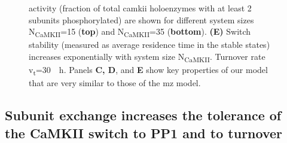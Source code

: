 \documentclass[9pt,lineno,doublespacing]{elife}
\newcommand\SUB[2]{#1\textsubscript{#2}}
\begin{document}
\begin{figure}[t]
{        activity (fraction of total \gls{camkii} holoenzymes with at least 2
        subunits phosphorylated) are shown for different system sizes
        \SUB{N}{CaMKII}=15 (\textbf{top}) and \SUB{N}{CaMKII}=35
	(\textbf{bottom}). \textbf{(E)} Switch stability (measured as average
	residence time in the stable states) increases exponentially with system
        size \SUB{N}{CaMKII}. Turnover rate \SUB{v}{t}=\SI{30}{\per \hour}.
        Panels \textbf{C, D}, and \textbf{E} show key properties of our model
        that are very similar to those of the \gls{mz} model.
    }\label{fig:validation} 
\end{figure}


\subsection{Subunit exchange increases the tolerance of the CaMKII switch to PP1
and to turnover}\label{subsec:result_tolerance}
\end{document}
